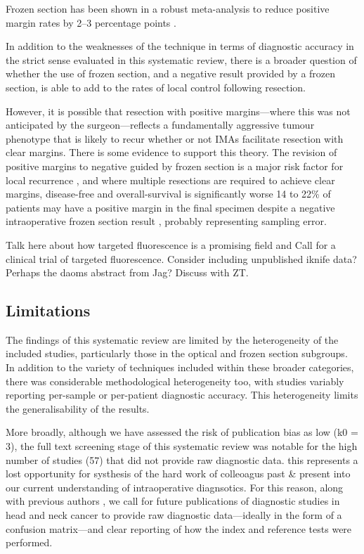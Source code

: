 Frozen section has been shown in a robust meta-analysis to reduce positive margin rates by 2--3 percentage points \cite{gorpheSystematicReviewMetaanalysis2019}.

In addition to the weaknesses of the technique in terms of diagnostic accuracy in the strict sense evaluated in this systematic review, there is a broader question of whether the use of frozen section, and a negative result provided by a frozen section, is able to add to the rates of local control following resection.

However, it is possible that resection with positive margins---where this was not anticipated by the surgeon---reflects a fundamentally aggressive tumour phenotype that is likely to recur whether or not IMAs facilitate resection with clear margins.
There is some evidence to support this theory.
The revision of positive margins to negative guided by frozen section is a major risk factor for local recurrence \cite{ettlt.PositiveFrozenSection2016}, and where multiple resections are required to achieve clear margins, disease-free and overall-survival is significantly worse \cite{mooreTransoralRoboticSurgery2018}
14 to 22\% of patients may have a positive margin in the final specimen despite a negative intraoperative frozen section result \cite{ordAccuracyFrozenSections1997, due.RefiningUtilityRole2016}, probably representing sampling error.

Talk here about how targeted fluorescence is a promising field and Call for a clinical trial of targeted fluorescence.
Consider including unpublished iknife data? Perhaps the daoms abstract from Jag? Discuss with ZT.

\subsection{Limitations}

The findings of this systematic review are limited by the heterogeneity of the included studies, particularly those in the optical and frozen section subgroups.
In addition to the variety of techniques included within these broader categories, there was considerable methodological heterogeneity too, with studies variably reporting per-sample or per-patient diagnostic accuracy.
This heterogeneity limits the generalisability of the results.

More broadly, although we have assessed the risk of publication bias as low (k0 = 3), the full text screening stage of this systematic review was notable for the high number of studies (57) that did not provide raw diagnostic data.
this represents a lost opportunity for systhesis of the hard work of colleoagus past \& present into our current understanding of intraoperative diagnsotics.
For this reason, along with previous authors \cite{stjohnDiagnosticAccuracyIntraoperative2017, irwigGuidelinesMetaanalysesEvaluating1994}, we call for future publications of diagnostic studies in head and neck cancer to provide raw diagnostic data---ideally in the form of a confusion matrix---and clear reporting of how the index and reference tests were performed.



